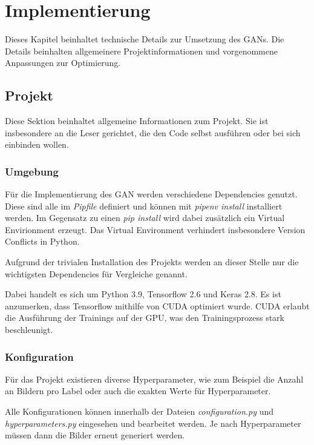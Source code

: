 
\chapter{Implementierung}
Dieses Kapitel beinhaltet technische Details zur Umsetzung des GANs.
Die Details beinhalten allgemeinere Projektinformationen und vorgenommene Anpassungen zur Optimierung.

\section{Projekt}
Diese Sektion beinhaltet allgemeine Informationen zum Projekt.
Sie ist insbesondere an die Leser gerichtet, die den Code selbst ausführen oder bei sich einbinden wollen.

\subsection{Umgebung}
Für die Implementierung des GAN werden verschiedene Dependencies genutzt.
Diese sind alle im \textit{Pipfile} definiert und können mit \textit{pipenv install} installiert werden.
Im Gegensatz zu einen \textit{pip install} wird dabei zusätzlich ein Virtual Envirionment erzeugt.
Das Virtual Environment verhindert insbesondere Version Conflicts in Python.
\newline

Aufgrund der trivialen Installation des Projekts werden an dieser Stelle nur die wichtigsten Dependencies für Vergleiche genannt.

Dabei handelt es sich um Python 3.9, Tensorflow 2.6 und Keras 2.8.
Es ist anzumerken, dass Tensorflow mithilfe von CUDA optimiert wurde.
CUDA erlaubt die Ausführung der Trainings auf der GPU, was den Trainingsprozess stark beschleunigt.

\subsection{Konfiguration}
\label{chapter:configuration-hyperparams}
Für das Projekt existieren diverse Hyperparameter, wie zum Beispiel die Anzahl an Bildern pro Label oder auch die exakten Werte für Hyperparameter.
\newline

Alle Konfigurationen können innerhalb der Dateien \textit{configuration.py} und \textit{hyperparameters.py} eingesehen und bearbeitet werden.
Je nach Hyperparameter müssen dann die Bilder erneut generiert werden.
\newline

